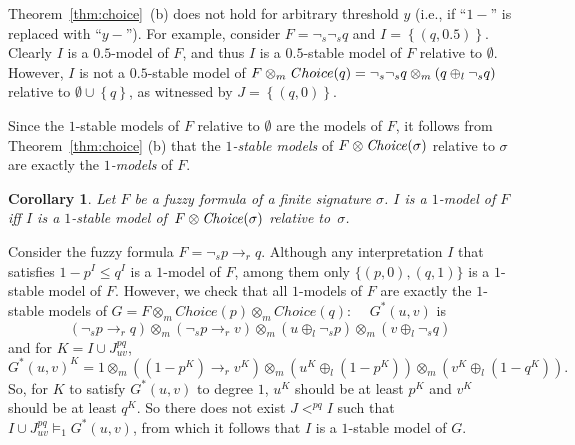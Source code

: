 \documentclass[runningheads]{llncs}
\def\o{\overline}
\def\i#1{\hbox{\it #1\/}}
\def\rar{\rightarrow}
\def\i#1{\hbox{\itshape #1\/}}
\def\fand{\otimes}
\def\for{\oplus}
\newtheorem{cor}{Corollary}
\begin{document}
Theorem~\ref{thm:choice}~(b) does not hold for arbitrary threshold
$y$ (i.e., if ``$1-$'' is replaced with ``$y-$''). For example, consider
$F=\neg_s\neg_s q$ and $I = \left\{(q, 0.5)\right\}$. Clearly $I$ is a
$0.5$-model of $F$, and thus $I$ is a $0.5$-stable model of $F$
relative to $\emptyset$. However, $I$ is not a $0.5$-stable model of
$F\fand_m {\i Choice(q)}=\neg_s \neg_s q\fand_m (q\for_l \neg_s q)$
relative to $\emptyset \cup \left\{q\right\}$, as witnessed by $J =
\left\{(q, 0)\right\}$.

Since the $1$-stable models of $F$ relative to $\emptyset$ are the models
of $F$, it follows from Theorem~\ref{thm:choice} (b)  that the {\em $1$-stable models} of $F\fand\i{Choice}(\sigma)$ relative to $\sigma$ are exactly the {\em $1$-models} of $F$.
\begin{cor}
Let $F$ be a fuzzy formula of a finite signature $\sigma$.
$I$ is a $1$-model of $F$ iff $I$ is a
$1$-stable model of~$F\fand\i{Choice}(\sigma)$ relative to~$\sigma$.
\end{cor}


\begin{example}
Consider the fuzzy formula $F=\neg_{\!s} p \rar_r q$. Although any
interpretation $I$ that satisfies $1-p^I \leq q^I$ is a $1$-model of
$F$, among them only $\{(p, 0), (q, 1)\}$ is a $1$-stable model of
$F$. However, we check that all $1$-models of $F$ are exactly the
$1$-stable models of $G = F\fand_m Choice(p) \fand_m Choice(q)$:\ \  
$G^*(u,v)$ is 
\[ 
   (\neg_{\!s} p \rar_r q) \fand_m (\neg_{\!s} p \rar_r v) \fand_m (u\for_l
   \neg_{\!s} p) \fand_m (v\for_l \neg_{\!s} q)
\]
and for $K = I\cup J^{pq}_{uv}$, 
\[
   G^*(u,v)^K = 1 \fand_m ((1-p^K) \rar_r v^K) \fand_m (u^K\for_l
   (1-p^K)) \fand_m (v^K\for_l (1-q^K)).
\]
So, for $K$ to satisfy $G^*(u,v)$ to degree $1$, $u^K$ should be 
at least $p^K$ and $v^K$ should be at least $q^K$. So there does not
exist $J <^{pq} I$ such that $I\cup J^{pq}_{uv} \models_1 G^*(u,v)$,
from which it follows that $I$ is a $1$-stable model of $G$.
\end{example}

\vspace{-0.3cm}
\end{document}
